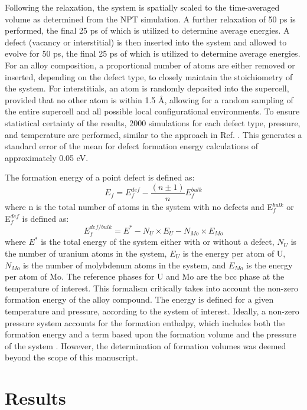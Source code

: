 \documentclass[default]{sn-jnl}%
\begin{document}
Following the relaxation, the system is spatially scaled to the time-averaged volume as determined from the NPT simulation. A further relaxation of 50 ps is performed, the final 25 ps of which is utilized to determine average energies. A defect (vacancy or interstitial) is then inserted into the system and allowed to evolve for 50 ps, the final 25 ps of which is utilized to determine average energies. For an alloy composition, a proportional number of atoms are either removed or inserted, depending on the defect type, to closely maintain the stoichiometry of the system. For interstitials, an atom is randomly deposited into the supercell, provided that no other atom is within 1.5 \AA, allowing for a random sampling of the entire supercell and all possible local configurational environments. To ensure statistical certainty of the results, 2000 simulations for each defect type, pressure, and temperature are performed, similar to the approach in Ref. \cite{zhang2021}. This generates a standard error of the mean for defect formation energy calculations of approximately 0.05 eV. 

The formation energy of a point defect is defined as:
\begin{equation}
 E_f= E_f^{def} -  \frac{(n\pm1)}{n}E_f^{bulk}
\end{equation}
\noindent where n is the total number of atoms in the system with no defects and E$_f^{bulk}$ or E$_f^{def}$ is defined as:
\begin{equation}
E_f^{def/bulk}= E^*- N_U \times E_U - N_{Mo} \times E_{Mo} 
\end{equation}
\noindent where $E^*$ is the total energy of the system either with or without a defect, $N_U$ is the number of uranium atoms in the system, $E_U$ is the energy per atom of U, $N_{Mo}$ is the number of molybdenum atoms in the system, and $E_{Mo}$ is the energy per atom of Mo. The reference phases for U and Mo are the bcc phase at the temperature of interest. This formalism critically takes into account the non-zero formation energy of the alloy compound. The energy is defined for a given temperature and pressure, according to the system of interest. Ideally, a non-zero pressure system accounts for the formation enthalpy, which includes both the formation energy and a term based upon the formation volume and the pressure of the system \cite{smirnova2015}. However, the determination of formation volumes was deemed beyond the scope of this manuscript. 

\section{Results}\label{sec3}
\end{document}
